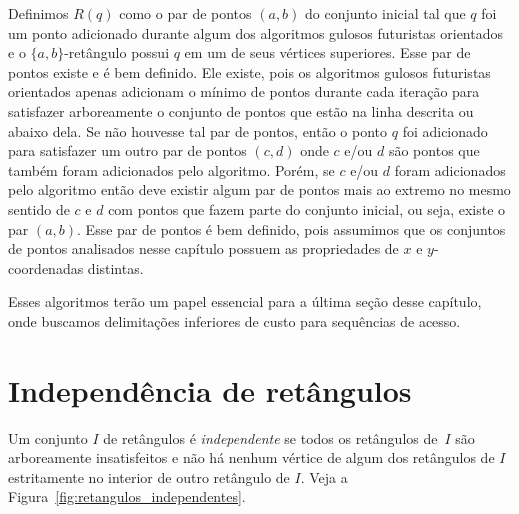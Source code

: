 Definimos $R(q)$ como o par de pontos $(a,b)$ do conjunto inicial tal que $q$ foi um ponto adicionado durante algum dos algoritmos gulosos futuristas orientados e o $\{a,b\}$-retângulo possui $q$ em um de seus vértices superiores. Esse par de pontos existe e é bem definido. Ele existe, pois os algoritmos gulosos futuristas orientados apenas adicionam o mínimo de pontos durante cada iteração para satisfazer arboreamente o conjunto de pontos que estão na linha descrita ou abaixo dela. Se não houvesse tal par de pontos, então o ponto $q$ foi adicionado para satisfazer um outro par de pontos $(c,d)$ onde $c$ e/ou $d$ são pontos que também foram adicionados pelo algoritmo. Porém, se $c$ e/ou $d$ foram adicionados pelo algoritmo então deve existir algum par de pontos mais ao extremo no mesmo sentido de $c$ e $d$ com pontos que fazem parte do conjunto inicial, ou seja, existe o par $(a,b)$. Esse par de pontos é bem definido, pois assumimos que os conjuntos de pontos analisados nesse capítulo possuem as propriedades de $x$ e $y$-coordenadas distintas.

Esses algoritmos terão um papel essencial para a última seção desse capítulo, onde buscamos delimitações inferiores de custo para sequências de acesso.

\section{Independência de retângulos}
Um conjunto $I$ de retângulos é \textit{independente} se todos os retângulos de~$I$ são arboreamente insatisfeitos e não há nenhum vértice de algum dos retângulos de $I$ estritamente no interior de outro retângulo de $I$. Veja a Figura~\ref{fig:retangulos_independentes}.

